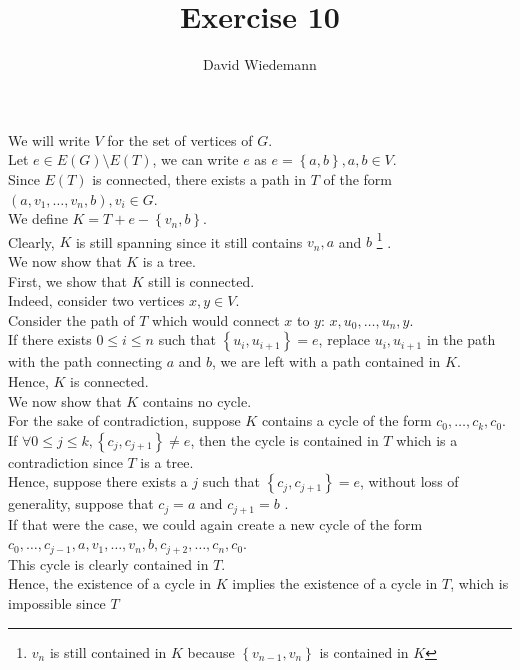 \documentclass[11pt, a4paper]{article}
\begin{document}
\title{Exercise 10}
\author{David Wiedemann}
\maketitle
We will write $V $ for the set of vertices of  $G$.\\
Let $e \in E( G) \setminus E( T) $, we can write $e$ as $e= \left\{ a,b \right\} , a,b \in V$.\\
Since $E( T)$ is connected, there exists a path in $T$ of the form $(a, v_1, \ldots, v_n,b), v_i \in G $.\\
We define $ K = T + e - \left\{ v_n,b \right\} $.\\
Clearly, $K$ is still spanning since it still contains $v_n, a $ and $b$ \footnote { $v_n$ is still contained in $K$ because $ \left\{ v_{n-1} , v_n \right\} $ is contained in $K$} .\\
We now show that $K$ is a tree.\\
First, we show that $K$ still is connected.\\
Indeed, consider two vertices $x,y \in V$.\\
Consider the path of $T$ which would connect $x$ to $y$: $x, u_0,\ldots, u_n, y$.\\
If there exists $0 \leq i \leq n$ such that $ \left\{ u_i, u_{i+1}  \right\} =e$, replace $ u_i, u_{i+1} $ in the path with the path connecting $a$ and $b$, we are left with a path contained in $K$.\\
Hence, $K$ is connected.\\
We now show that $K$ contains no cycle.\\
For the sake of contradiction, suppose $K$ contains a cycle of the form $c_0, \ldots, c_k, c_0$.\\
If $\forall 0 \leq j \leq k, \left\{ c_j, c_{j+1}  \right\} \neq e$, then the cycle is contained in $T$ which is a contradiction since $T$ is a tree.\\
Hence, suppose there exists a $j$ such that $ \left\{ c_j, c_{j+1}  \right\} = e$, without loss of generality, suppose that $c_j =a$ and $c_{j+1} =b$	.\\
If that were the case, we could again create a new cycle of the form $ c_0, \ldots, c_{j-1} , a,v_1 , \ldots, v_n, b , c_{j+2} ,\ldots, c_n, c_0 $.\\
This cycle is clearly contained in $T$.\\
Hence, the existence of a cycle in $K$ implies the existence of a cycle in $T$, which is impossible since $T$
\end{document}
